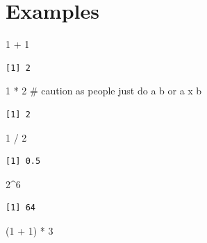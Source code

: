 \documentclass[
  letterpaper,
  DIV=11,
  numbers=noendperiod]{scrreprt}
\newenvironment{Shaded}{\begin{snugshade}}{\end{snugshade}}
\newcommand{\CommentTok}[1]{\textcolor[rgb]{0.37,0.37,0.37}{#1}}
\newcommand{\DecValTok}[1]{\textcolor[rgb]{0.68,0.00,0.00}{#1}}
\newcommand{\NormalTok}[1]{\textcolor[rgb]{0.00,0.23,0.31}{#1}}
\newcommand{\SpecialCharTok}[1]{\textcolor[rgb]{0.37,0.37,0.37}{#1}}
\begin{document}
\section*{Examples}\label{examples-29}


\begin{Shaded}
\begin{Highlighting}[]
\DecValTok{1} \SpecialCharTok{+} \DecValTok{1}
\end{Highlighting}
\end{Shaded}

\begin{verbatim}
[1] 2
\end{verbatim}

\begin{Shaded}
\begin{Highlighting}[]
\DecValTok{1} \SpecialCharTok{*} \DecValTok{2} \CommentTok{\# caution as people just do a b or a x b}
\end{Highlighting}
\end{Shaded}

\begin{verbatim}
[1] 2
\end{verbatim}

\begin{Shaded}
\begin{Highlighting}[]
\DecValTok{1} \SpecialCharTok{/} \DecValTok{2}
\end{Highlighting}
\end{Shaded}

\begin{verbatim}
[1] 0.5
\end{verbatim}

\begin{Shaded}
\begin{Highlighting}[]
\DecValTok{2}\SpecialCharTok{\^{}}\DecValTok{6}
\end{Highlighting}
\end{Shaded}

\begin{verbatim}
[1] 64
\end{verbatim}

\begin{Shaded}
\begin{Highlighting}[]
\NormalTok{(}\DecValTok{1} \SpecialCharTok{+} \DecValTok{1}\NormalTok{) }\SpecialCharTok{*} \DecValTok{3}
\end{Highlighting}
\end{Shaded}
\end{document}
